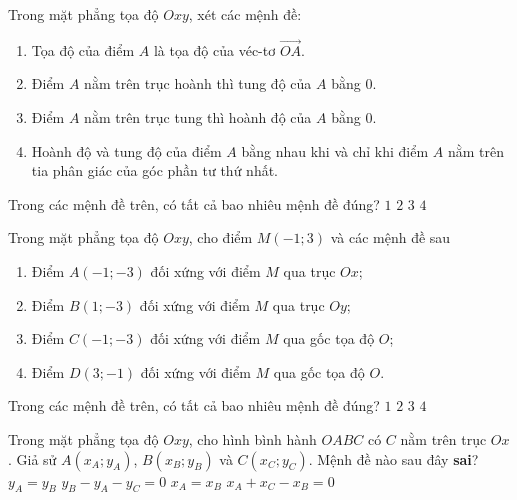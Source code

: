 \begin{ex}%
	Trong mặt phẳng tọa độ $Oxy$, xét các mệnh đề:
	{\fontsize{12pt}{6pt}\selectfont
		\begin{enumerate}[\qquad a)]
			\item Tọa độ của điểm $A$ là tọa độ của véc-tơ $\vec{OA}$.
			\item Điểm $A$ nằm trên trục hoành thì tung độ của $A$ bằng $0$.
			\item Điểm $A$ nằm trên trục tung thì hoành độ của $A$ bằng $0$.
			\item Hoành độ và tung độ của điểm $A$ bằng nhau khi và chỉ khi điểm $A$ nằm trên tia phân giác của góc phần tư thứ nhất.
		\end{enumerate}
	}
	Trong các mệnh đề trên, có tất cả bao nhiêu mệnh đề đúng?
	\choice
	{$1$}
	{$2$}
	{\True $3$}
	{$4$}
\end{ex}

\begin{ex}%
	Trong mặt phẳng tọa độ $Oxy$, cho điểm $M(-1;3)$ và các mệnh đề sau
	{\fontsize{12pt}{12pt}\selectfont
		\begin{enumerate}[\qquad a)]
			\item Điểm $A(-1;-3)$ đối xứng với điểm $M$ qua trục $Ox$;
			\item Điểm $B(1;-3)$ đối xứng với điểm $M$ qua trục $Oy$;
			\item Điểm $C(-1;-3)$ đối xứng với điểm $M$ qua gốc tọa độ $O$;
			\item Điểm $D(3;-1)$ đối xứng với điểm $M$ qua gốc tọa độ $O$.
		\end{enumerate}
	}
	Trong các mệnh đề trên, có tất cả bao nhiêu mệnh đề đúng?
	\choice
	{\True $1$}
	{$2$}
	{$3$}
	{$4$}	
\end{ex}

\begin{ex}%
	Trong mặt phẳng tọa độ $Oxy$, cho hình bình hành $OABC$ có $C$ nằm trên trục $Ox$. Giả sử $A\left(x_A; y_A\right)$, $B\left(x_B; y_B\right)$ và $C\left(x_C; y_C\right)$. Mệnh đề nào sau đây \textbf{sai}?
	\choice
	{$y_A=y_B$}
	{$y_B-y_A-y_C=0$}
	{\True $x_A=x_B$}
	{$x_A+x_C-x_B=0$}
\end{ex}

